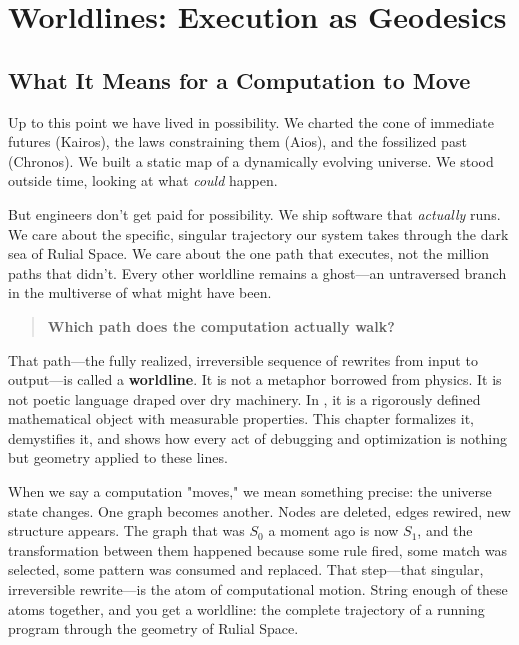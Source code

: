 \chapter{Worldlines: Execution as Geodesics}
\label{chapter-6-worldlines-execution-as-geodesics}

\section{What It Means for a Computation to Move}
\label{what-it-means-for-a-computation-to-move}

Up to this point we have lived in possibility. We charted the cone of immediate futures (Kairos), the
laws constraining them (Aios), and the fossilized past (Chronos). We built a static map of a
dynamically evolving universe. We stood outside time, looking at what \emph{could} happen.

But engineers don't get paid for possibility. We ship software that \emph{actually} runs. We care
about the specific, singular trajectory our system takes through the dark sea of Rulial Space. We
care about the one path that executes, not the million paths that didn't. Every other worldline
remains a ghost—an untraversed branch in the multiverse of what might have been.

\begin{quote}
\textbf{Which path does the computation actually walk?}
\end{quote}

That path—the fully realized, irreversible sequence of rewrites from input to output—is called a
\textbf{worldline}. It is not a metaphor borrowed from physics. It is not poetic language draped
over dry machinery. In \COMPUTER{}, it is a rigorously defined mathematical object with
measurable properties. This chapter formalizes it, demystifies it, and shows how every act of
debugging and optimization is nothing but geometry applied to these lines.

When we say a computation "moves," we mean something precise: the universe state changes. One graph
becomes another. Nodes are deleted, edges rewired, new structure appears. The \WARP graph that was
$S_0$ a moment ago is now $S_1$, and the transformation between them happened because some rule
fired, some match was selected, some pattern was consumed and replaced. That step—that singular,
irreversible rewrite—is the atom of computational motion. String enough of these atoms together, and
you get a worldline: the complete trajectory of a running program through the geometry of Rulial Space.

